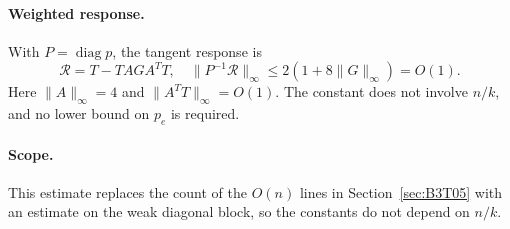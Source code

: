 \paragraph{Weighted response.}
With $P=\operatorname{diag}p$, the tangent response is
\[
 \mathcal R=T-TAG A^TT,
 \quad\|P^{-1}\mathcal R\|_\infty
 \le2(1+8\|G\|_\infty)=O(1).
\]
Here $\|A\|_\infty=4$ and $\|A^TT\|_\infty=O(1)$.
The constant does not involve $n/k$, and no lower bound on $p_e$ is required.

\paragraph{Scope.}
This estimate replaces the count of the $O(n)$ lines in Section~\ref{sec:B3T05} with an estimate on the
weak diagonal block, so the constants do not depend on $n/k$.
